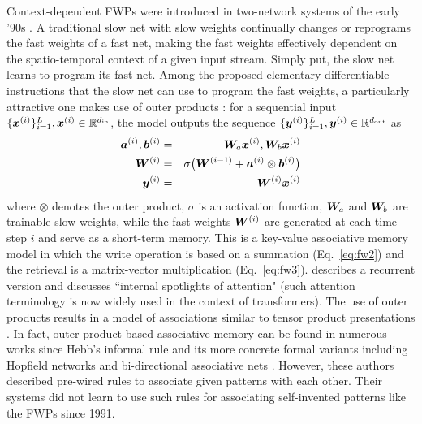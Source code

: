 \documentclass{article}
\theoremstyle{definition}
\begin{document}
Context-dependent FWPs were
introduced in two-network systems of the early '90s \citep{Schmidhuber:91fastweights, schmidhuber1992learning, schmidhuber1993reducing,schmidhuber2021fwp}.
A traditional slow net with slow weights continually changes or reprograms the fast weights of a fast net,
making the fast weights effectively dependent on the spatio-temporal context of a given input stream.
Simply put, the slow net learns to program its fast net. 
Among the proposed elementary differentiable instructions that the slow net can use to program the fast weights,
a particularly attractive one makes use of outer products \citep{Schmidhuber:91fastweights, schmidhuber1992learning}:
for a sequential input $\{ {\bm{x}}^{(i)} \}_{i=1}^L, {\bm{x}}^{(i)} \in \mathbb{R}^{d_\text{in}}$,
the model outputs the sequence $\{ {\bm{y}}^{(i)} \}_{i=1}^L, {\bm{y}}^{(i)} \in \mathbb{R}^{d_\text{out}}$ as
\begin{eqnarray}
{\bm{a}}^{(i)}, {\bm{b}}^{(i)} &=& {\bm{W}}_{a} {\bm{x}}^{(i)}, {\bm{W}}_{b} {\bm{x}}^{(i)} \label{eq:fw1} \\
{\bm{W}}^{(i)} &=& \sigma\big({\bm{W}}^{(i-1)} + {\bm{a}}^{(i)} \otimes {\bm{b}}^{(i)}\big) \label{eq:fw2} \\
{\bm{y}}^{(i)} &=& {\bm{W}}^{(i)} {\bm{x}}^{(i)} \label{eq:fw3}
\end{eqnarray}
where $\otimes$ denotes the outer product, $\sigma$ is an activation function, ${\bm{W}}_{a}$ and ${\bm{W}}_{b}$ are trainable slow weights, while the fast weights ${\bm{W}}^{(i)}$ are generated at each time step $i$ and serve as a short-term memory.
This is a key-value associative memory model in which the write operation is based on a summation (Eq.~\ref{eq:fw2})
and the retrieval is a matrix-vector multiplication (Eq.~\ref{eq:fw3}).
\citet{schmidhuber1993reducing} describes a recurrent version and discusses ``internal spotlights of attention" (such attention terminology is now widely used in the context of transformers).
The use of outer products results in a model of associations similar to tensor product presentations \cite{smolensky1990tensor}.
In fact, outer-product based associative memory can be found in
numerous works since Hebb's informal rule \citep{hebb1949organization} and its more concrete formal variants  \citep{steinbuch61, steinbuchP63, kohonen72, palm1980associative} including Hopfield networks \citep{hopfield1982neural, little1974existence} and bi-directional associative nets \citep{kosko1988bidirectional}. However, these authors described pre-wired rules to associate given patterns with each other. Their systems did not learn to use such rules for associating self-invented patterns like the FWPs since 1991.
\end{document}
